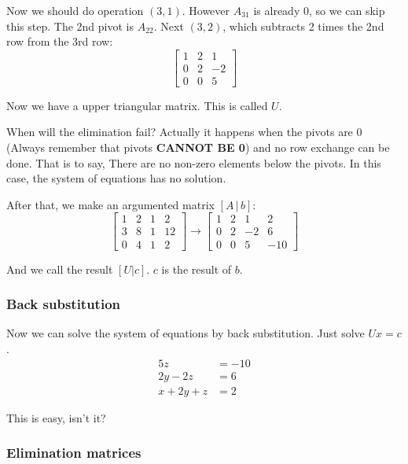 \documentclass[12pt]{ctexart}
\begin{document}
Now we should do operation $(3, 1)$. However $A_{31}$ is already 0, so we can skip
this step. The 2nd pivot is $A_{22}$. Next $(3, 2)$, which subtracts 2 times the 2nd row
from the 3rd row:
\[
  \begin{bmatrix}
    1 & 2 & 1 \\
    0 & 2 & -2 \\
    0 & 0 & 5
  \end{bmatrix}
\]

Now we have a upper triangular matrix. This is called $U$.

When will the elimination fail? Actually it happens when the pivots are 0 (Always
remember that pivots \textbf{CANNOT BE 0}) and no row exchange can be done. That is to
say, There are no non-zero elements below the pivots. In this case, the system of
equations has no solution.

After that, we make an argumented matrix $[A\,|\,b]$:
\[
  \left[
  \begin{array}{ccc|c}
    1 & 2 & 1 & 2 \\
    3 & 8 & 1 & 12 \\
    0 & 4 & 1 & 2
  \end{array}
  \right]
  \rightarrow
  \left[
  \begin{array}{ccc|c}
    1 & 2 & 1 & 2 \\
    0 & 2 & -2 & 6 \\
    0 & 0 & 5 & -10
  \end{array}
  \right]
\]

And we call the result $[U|c]$. $c$ is the result of $b$.

\subsubsection{\textbf{Back substitution}}

Now we can solve the system of equations by back substitution. Just solve $Ux = c$.
\begin{equation}
    \begin{aligned}
        5z &= -10 \\
        2y - 2z &= 6 \\
        x + 2y + z &= 2
    \end{aligned}
\end{equation}

This is easy, isn't it?

\subsubsection{\textbf{Elimination matrices}}
\end{document}
